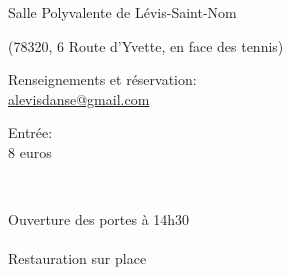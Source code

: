 \documentclass[12pt,a4paper]{article}
\begin{document}

\vspace*{25mm}

\fontsize{20pt}{20pt}\selectfont

Salle Polyvalente de Lévis-Saint-Nom

{\fontsize{14pt}{16pt}\selectfont
(78320, 6 Route d'Yvette, en face des tennis)}

\vspace*{5mm}

Renseignements et réservation: \\
\href{mailto:alevisdanse@gmail.com}{alevisdanse@gmail.com}


\vspace*{5mm}

Entrée: \\
8 euros

\vspace*{-30mm}
\vfill

~\hfill\begin{minipage}{0.25\linewidth}
  \begin{center}
    Ouverture des portes
    à 14h30\\
    ~\\
    Restauration
    sur place\\
    ~\\
    ~\\
    ~\\
\end{center}
\end{minipage}

\end{document}
